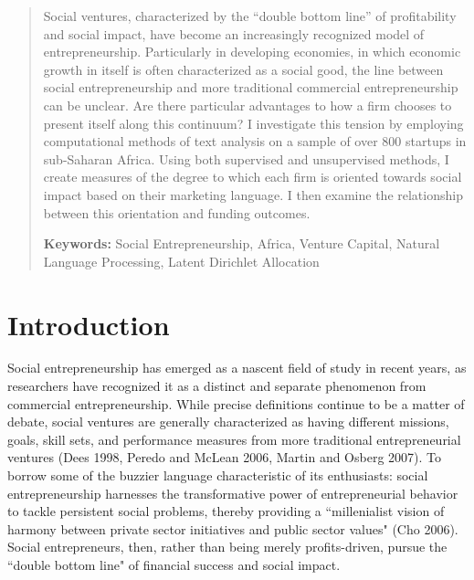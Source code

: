 \documentclass[12pt]{article}
\begin{document}
\maketitle

\begin{abstract}
Social ventures, characterized by the ``double bottom line'' of profitability and social impact, have become an increasingly recognized model of entrepreneurship. Particularly in developing economies, in which economic growth in itself is often characterized as a social good, the line between social entrepreneurship and more traditional commercial entrepreneurship can be unclear. Are there particular advantages to how a firm chooses to present itself along this continuum? I investigate this tension by employing computational methods of text analysis on a sample of over 800 startups in sub-Saharan Africa. Using both supervised and unsupervised methods, I create measures of the degree to which each firm is oriented towards social impact based on their marketing language. I then examine the relationship between this orientation and funding outcomes.

\smallskip
\noindent \textbf{Keywords:} Social Entrepreneurship, Africa, Venture Capital, Natural Language Processing, Latent Dirichlet Allocation 

\end{abstract}


\section{Introduction}


Social entrepreneurship has emerged as a nascent field of study in recent years, as researchers have recognized it as a distinct and separate phenomenon from commercial entrepreneurship. While precise definitions continue to be a matter of debate, social ventures are generally characterized as having different missions, goals, skill sets, and performance measures from more traditional entrepreneurial ventures (Dees 1998, Peredo and McLean 2006, Martin and Osberg 2007). To borrow some of the buzzier language characteristic of its enthusiasts: social entrepreneurship harnesses the transformative power of entrepreneurial behavior to tackle persistent social problems, thereby providing a ``millenialist vision of harmony between private sector initiatives and public sector values" (Cho 2006). Social entrepreneurs, then, rather than being merely profits-driven, pursue the ``double bottom line" of financial success and social impact. 
\end{document}
